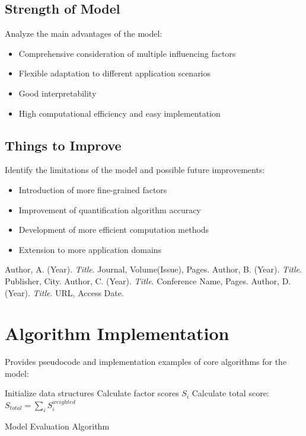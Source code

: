 \documentclass[12pt,a4paper]{article}
\begin{document}
\subsection{Strength of Model}
Analyze the main advantages of the model:
\begin{itemize}
  \item Comprehensive consideration of multiple influencing factors
  \item Flexible adaptation to different application scenarios
  \item Good interpretability
  \item High computational efficiency and easy implementation
\end{itemize}

\subsection{Things to Improve}
Identify the limitations of the model and possible future improvements:
\begin{itemize}
  \item Introduction of more fine-grained factors
  \item Improvement of quantification algorithm accuracy
  \item Development of more efficient computation methods
  \item Extension to more application domains
\end{itemize}

\newpage
\begin{thebibliography}{99}
 Author, A. (Year). \textit{Title}. Journal, Volume(Issue), Pages.
 Author, B. (Year). \textit{Title}. Publisher, City.
 Author, C. (Year). \textit{Title}. Conference Name, Pages.
 Author, D. (Year). \textit{Title}. URL, Access Date.
\end{thebibliography}

\newpage
\appendix

\section{Algorithm Implementation}
Provides pseudocode and implementation examples of core algorithms for the model:
\begin{algorithm}[H]
\SetAlgoLined
{}
Initialize data structures\;
Calculate factor scores $S_i$\;
Calculate total score: $S_{total} = \sum_{i} S_i^{weighted}$\;
\caption{Model Evaluation Algorithm}
\end{algorithm}
\end{document}

